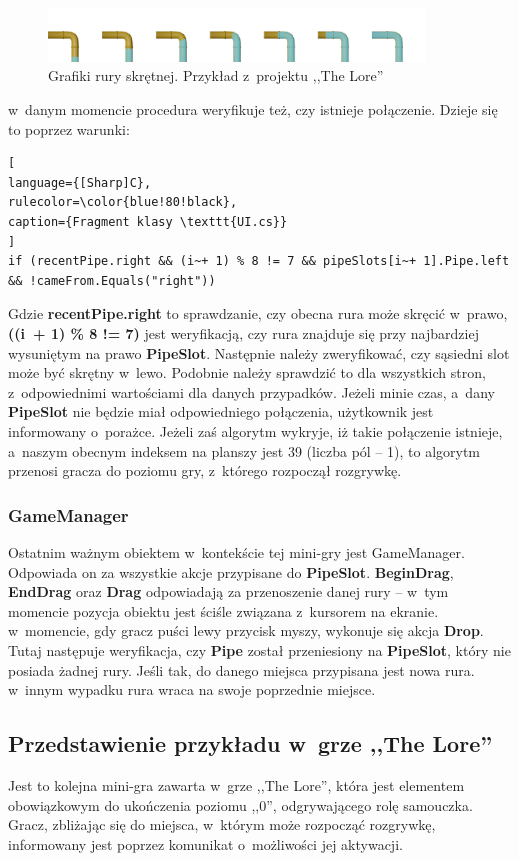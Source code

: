 \documentclass[oneside,polski,logo]{amuthesis}
\begin{document}
\begin{figure}[h]
	\centering
	\includegraphics[width=10cm]{images/tyrek/rury-5.png}
	\caption{Grafiki rury skrętnej. Przykład z~projektu ,,The Lore''}
\end{figure}
w~danym momencie procedura weryfikuje też, czy istnieje połączenie. Dzieje się to poprzez warunki:
\begin{lstlisting}[
language={[Sharp]C},
rulecolor=\color{blue!80!black},
caption={Fragment klasy \texttt{UI.cs}}
]
if (recentPipe.right && (i~+ 1) % 8 != 7 && pipeSlots[i~+ 1].Pipe.left 
&& !cameFrom.Equals("right"))
\end{lstlisting}
Gdzie \textbf{recentPipe.right} to sprawdzanie, czy obecna rura może skręcić w~prawo, \textbf{((i~+ 1) \% 8 != 7)} jest weryfikacją, czy rura znajduje się przy najbardziej wysuniętym na prawo \textbf{PipeSlot}. Następnie należy zweryfikować, czy sąsiedni slot może być skrętny w~lewo. Podobnie należy sprawdzić to dla wszystkich stron, z~odpowiednimi wartościami dla danych przypadków. Jeżeli minie czas, a~dany \textbf{PipeSlot} nie będzie miał odpowiedniego połączenia, użytkownik jest informowany o~porażce. Jeżeli zaś algorytm wykryje, iż takie połączenie istnieje, a~naszym obecnym indeksem na planszy jest 39 (liczba pól – 1), to algorytm przenosi gracza do poziomu gry, z~którego rozpoczął rozgrywkę.

\subsubsection{GameManager}
\par Ostatnim ważnym obiektem w~kontekście tej mini-gry jest GameManager. Odpowiada on za wszystkie akcje przypisane do \textbf{PipeSlot}. \textbf{BeginDrag}, \textbf{EndDrag} oraz \textbf{Drag} odpowiadają za przenoszenie danej rury – w~tym momencie pozycja obiektu jest ściśle związana z~kursorem na ekranie. w~momencie, gdy gracz puści lewy przycisk myszy, wykonuje się akcja \textbf{Drop}. Tutaj następuje weryfikacja, czy \textbf{Pipe} został przeniesiony na \textbf{PipeSlot}, który nie posiada żadnej rury. Jeśli tak, do danego miejsca przypisana jest nowa rura. w~innym wypadku rura wraca na swoje poprzednie miejsce. 
\subsection{Przedstawienie przykładu w~grze ,,The Lore''}
\par Jest to kolejna mini-gra zawarta w~grze ,,The Lore'', która jest elementem obowiązkowym do ukończenia poziomu ,,0'', odgrywającego rolę samouczka. Gracz, zbliżając się do miejsca, w~którym może rozpocząć rozgrywkę, informowany jest poprzez komunikat o~możliwości jej aktywacji.
\end{document}
